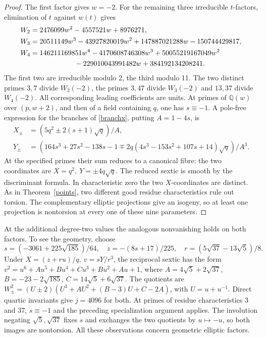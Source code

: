 \documentclass[11pt]{article}
\newcommand{\Q}{\mathbb Q}
\begin{document}
\begin{proof}
The first factor gives $w=-2$. For the remaining three irreducible
$t$-factors, elimination of $t$ against $w(t)$ gives
\begin{align*}
 W_2&=2476099w^2-4557521w+8976271,\\
 W_3&=20511149w^3-43927820019w^2+147887021288w-150744429817,\\
 W_4&=146211169851w^4-4170608746308w^3+50055219167049w^2\\
    &\hspace{22mm}-229010043991482w+384192134208241 .
\end{align*}
The first two are irreducible modulo 2, the third modulo 11. The two
distinct primes $3,7$ divide $W_2(-2)$, the primes $3,47$ divide
$W_3(-2)$ and $13,37$ divide $W_4(-2)$. All corresponding leading
coefficients are units. At primes of $\Q(w)$ over $(p,w+2)$, and then
of a field containing $q$, one has $s\equiv-1$. A pole-free expression
for the branches of \eqref{branchx}, putting $A=1-4s$, is
\begin{align*}
 X_\pm&=(5q^2\pm2(s+1)\sqrt q)/A,\\
 Y_\pm&=(164s^3+27s^2-138s-1\mp2q(4s^3-153s^2+107s+14)\sqrt q)/A^3 .
\end{align*}
At the specified primes their sum reduces to a canonical fibre: the
two coordinates are $X=q^2,\ Y=\pm4q\sqrt q$. The reduced sextic is
smooth by the discriminant formula. In characteristic zero the two
$X$-coordinates are distinct. As in Theorem~\ref{points}, two
different good residue characteristics rule out torsion. The
complementary elliptic projections give an isogeny, so at least one
projection is nontorsion at every one of these nine parameters.
\end{proof}

At the additional degree-two values the analogous nonvanishing holds
on both factors. To see the geometry, choose
\[
 s=(-3061+225\sqrt{185})/64,\quad
 z=-(8s+17)/225,\quad r=(5\sqrt{37}-13\sqrt5)/8.
\]
Under $X=(z+ru)/q,\ v=sY/r^3$, the reciprocal sextic has the form
$v^2=u^6+Au^5+Bu^4+Cu^3+Bu^2+Au+1$, where
$A=4\sqrt5+2\sqrt{37}$, $B=-23-2\sqrt{185}$,
$C=14\sqrt5+6\sqrt{37}$. The quotients are
$W_\pm^2=(U\pm2)(U^3+AU^2+(B-3)U+C-2A)$, with $U=u+u^{-1}$.
Direct quartic invariants give $j=4096$ for both. At primes of residue
characteristics 3 and 37, $s\equiv-1$ and the preceding specialization
argument applies. The involution negating $\sqrt5,\sqrt{37}$ fixes $s$
and exchanges the two quotients by $u\mapsto-u$, so both images are
nontorsion. All these observations concern geometric elliptic factors.
\end{document}

